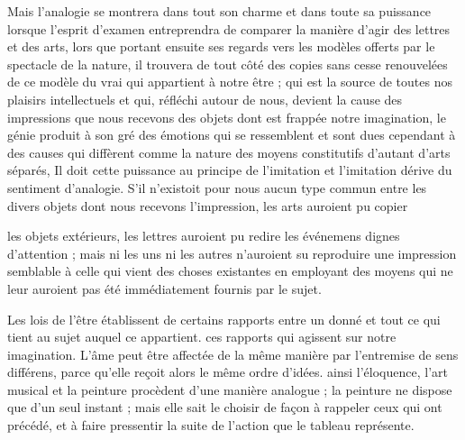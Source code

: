 \documentclass[11pt,a4paper]{article}
\begin{document}
Mais l'analogie se montrera dans tout son charme et dans toute sa
puissance  lorsque l'esprit d'examen entreprendra de
comparer la manière d'agir des lettres et des arts,  lors que
portant ensuite ses regards vers les modèles offerts par le spectacle de
la nature, il trouvera de tout côté des copies sans cesse renouvelées de
ce modèle du vrai qui appartient à notre être ; qui est la source de
toutes nos plaisirs intellectuels et qui, réfléchi autour de nous,
 devient la cause des impressions que nous
recevons des objets  dont est frappée notre imagination,
 le génie  produit à
son gré des émotions  qui se ressemblent et sont dues
cependant à des causes qui diffèrent comme la nature des moyens
 constitutifs
d'autant d'arts séparés,  Il
doit cette puissance au principe de l'imitation et l'imitation dérive
du sentiment d'analogie. S'il n'existoit pour nous aucun type commun
entre les divers objets dont nous recevons l'impression, les arts
auroient pu copier 

les objets extérieurs, les lettres auroient pu redire les événemens
dignes d'attention ; mais ni les uns ni les autres n'auroient su
reproduire une impression semblable à celle qui vient des choses
existantes en employant  des moyens qui ne
leur auroient pas été immédiatement fournis par le sujet.

 Les lois de l'être établissent de
certains rapports entre un  donné et tout ce qui tient
au sujet auquel ce  appartient. 
ces rapports qui agissent sur notre imagination. L'âme peut être affectée
de la même manière par l'entremise de sens différens, parce qu'elle
reçoit alors le même ordre d'idées. ainsi l'éloquence, l'art musical et
la peinture  
procèdent d'une manière analogue ; la peinture ne dispose que d'un seul
instant ; mais elle sait le choisir de façon à rappeler ceux qui ont
précédé, et à faire pressentir la suite de l'action que le tableau
représente.
\end{document}
